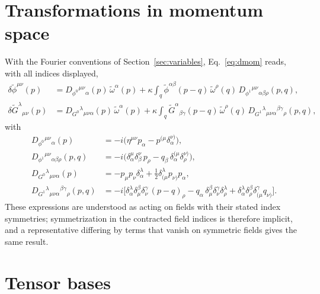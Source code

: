 \documentclass[prd,aps,preprint,nofootinbib,amsmath,amssymb,eqsecnum]{revtex4-2}
\newcommand{\tomega}{\tilde{\omega}}
\newcommand{\p}{\tilde{\phi}}
\newcommand{\G}{\tilde{G}}
\newcommand{\ip}[1]{\int_{#1}}
\begin{document}
\section{Transformations in momentum space}
\label{app:momentum}

With the Fourier conventions of Section~\ref{sec:variables}, Eq.~\eqref{eq:dmom} reads, with
all indices displayed,
\begin{align}
\delta\p^{\mu\nu}(p)&=D_{\phi^0}{}^{\mu\nu}{}_{\alpha}(p)\,\tomega^\alpha(p)
+\kappa\ip{q}\p^{\alpha\beta}(p-q)\,\tomega^\rho(q)\,D_{\phi^1}{}^{\mu\nu}{}_{\alpha\beta\rho}(p,q),\\
\delta\G^{\lambda}{}_{\mu\nu}(p)&=D_{G^0}{}^{\lambda}{}_{\mu\nu\alpha}(p)\,\tomega^\alpha(p)
+\kappa\ip{q}\G^{\alpha}{}_{\beta\gamma}(p-q)\,\tomega^\rho(q)\,
D_{G^1}{}^{\lambda}{}_{\mu\nu\alpha}{}^{\beta\gamma}{}_{\rho}(p,q),
\end{align}
with
\begin{align}
D_{\phi^0}{}^{\mu\nu}{}_{\alpha}(p)&=-i\big(\eta^{\mu\nu}p_\alpha-p^{(\mu}\delta^{\nu)}_{\alpha}\big),\\
D_{\phi^1}{}^{\mu\nu}{}_{\alpha\beta\rho}(p,q)&=-i\big(\delta^{\mu}_{\alpha}\delta^{\nu}_{\beta}\,p_\rho
-q_\beta\,\delta^{(\mu}_{\alpha}\delta^{\nu)}_{\rho}\big),\\
D_{G^0}{}^{\lambda}{}_{\mu\nu\alpha}(p)&=-p_\mu p_\nu\delta^{\lambda}_{\alpha}
+\tfrac12\delta^{\lambda}_{(\mu}p_{\nu)}p_\alpha,\\
D_{G^1}{}^{\lambda}{}_{\mu\nu\alpha}{}^{\beta\gamma}{}_{\rho}(p,q)&=-i\big[
\delta^{\lambda}_{\alpha}\delta^{\beta}_{\mu}\delta^{\gamma}_{\nu}\,(p-q)_\rho
-q_\alpha\,\delta^{\beta}_{\mu}\delta^{\gamma}_{\nu}\delta^{\lambda}_{\rho}
+\delta^{\lambda}_{\alpha}\delta^{\beta}_{\rho}\delta^{\gamma}_{(\mu}q_{\nu)}\big].
\end{align}
These expressions are understood as acting on fields with their stated index
symmetries; symmetrization in the contracted field indices is therefore implicit, and a
representative differing by terms that vanish on symmetric fields gives the same result.

\section{Tensor bases}
\label{app:bases}
\end{document}
